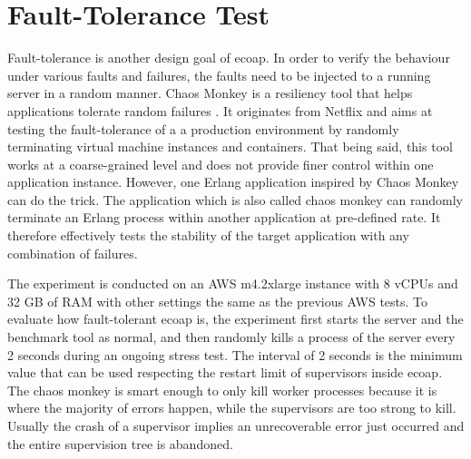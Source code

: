 \section{Fault-Tolerance Test}

Fault-tolerance is another design goal of ecoap. In order to verify the behaviour under various faults and failures, the faults need to be injected to a running server in a random manner. Chaos Monkey is a resiliency tool that helps applications tolerate random failures \autocite{chaos_monkey_netflix}. It originates from Netflix and aims at testing the fault-tolerance of a a production environment by randomly terminating virtual machine instances and containers. That being said, this tool works at a coarse-grained level and does not provide finer control within one application instance. However, one Erlang application inspired by Chaos Monkey can do the trick. The application which is also called chaos monkey \autocite{chaos_monkey_erl} can randomly terminate an Erlang process within another application at pre-defined rate. It therefore effectively tests the stability of the target application with any combination of failures. 

The experiment is conducted on an AWS m4.2xlarge instance with 8 vCPUs and 32 GB of RAM with other settings the same as the previous AWS tests. To evaluate how fault-tolerant ecoap is, the experiment first starts the server and the benchmark tool as normal, and then randomly kills a process of the server every 2 seconds during an ongoing stress test. The interval of 2 seconds is the minimum value that can be used respecting the restart limit of supervisors inside ecoap. The chaos monkey is smart enough to only kill worker processes because it is where the majority of errors happen, while the supervisors are too strong to kill. Usually the crash of a supervisor implies an unrecoverable error just occurred and the entire supervision tree is abandoned. 

